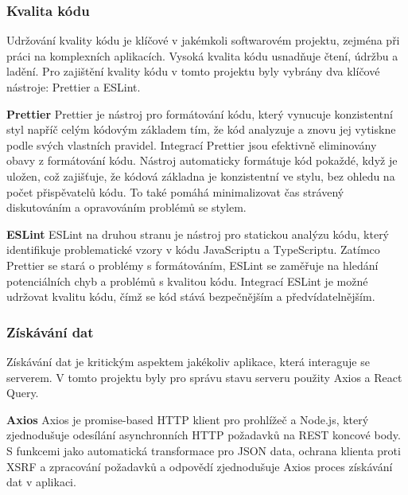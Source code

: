 \subsubsection{Kvalita kódu}
\label{subsubsec:implementace-techologie-ostatni-kvalita}
Udržování kvality kódu je klíčové v jakémkoli softwarovém projektu, zejména při práci na komplexních aplikacích.
Vysoká kvalita kódu usnadňuje čtení, údržbu a ladění.
Pro zajištění kvality kódu v tomto projektu byly vybrány dva klíčové nástroje: Prettier a ESLint.

\textbf{Prettier}
Prettier je nástroj pro formátování kódu, který vynucuje konzistentní styl napříč celým kódovým základem tím, že kód analyzuje a znovu jej vytiskne podle svých vlastních pravidel.
Integrací Prettier jsou efektivně eliminovány obavy z formátování kódu.
Nástroj automaticky formátuje kód pokaždé, když je uložen, což zajišťuje, že kódová základna je konzistentní ve stylu, bez ohledu na počet přispěvatelů kódu.
To také pomáhá minimalizovat čas strávený diskutováním a opravováním problémů se stylem.

\textbf{ESLint}
ESLint na druhou stranu je nástroj pro statickou analýzu kódu, který identifikuje problematické vzory v kódu JavaScriptu a TypeScriptu.
Zatímco Prettier se stará o problémy s formátováním, ESLint se zaměřuje na hledání potenciálních chyb a problémů s kvalitou kódu.
Integrací ESLint je možné udržovat kvalitu kódu, čímž se kód stává bezpečnějším a předvídatelnějším.

\subsubsection{Získávání dat}
\label{subsubsec:implementace-techologie-ostatni-ziskavani}
Získávání dat je kritickým aspektem jakékoliv aplikace, která interaguje se serverem.
V tomto projektu byly pro správu stavu serveru použity Axios a React Query.

\textbf{Axios}
Axios je promise-based HTTP klient pro prohlížeč a Node.js, který zjednodušuje odesílání asynchronních HTTP požadavků na REST koncové body.
S funkcemi jako automatická transformace pro JSON data, ochrana klienta proti XSRF a zpracování požadavků a odpovědí zjednodušuje Axios proces získávání dat v aplikaci.

